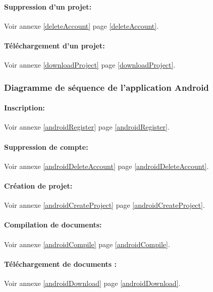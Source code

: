 \documentclass[a4paper,12pt]{article}
\begin{document}
\paragraph{Suppression d'un projet:\\}
Voir annexe \ref{deleteAccount} page \ref{deleteAccount}.

\paragraph{Téléchargement d'un projet:\\}
Voir annexe \ref{downloadProject} page \ref{downloadProject}.

\subsubsection{Diagramme de séquence de l'application Android}

\paragraph{Inscription:\\}
Voir annexe \ref{androidRegister} page \ref{androidRegister}.

\paragraph{Suppression de compte:\\}
Voir annexe \ref{androidDeleteAccount} page \ref{androidDeleteAccount}.

\paragraph{Création de projet:\\}
Voir annexe \ref{androidCreateProject} page \ref{androidCreateProject}.

\paragraph{Compilation de documents:\\}
Voir annexe \ref{androidCompile} page \ref{androidCompile}.

\paragraph{Téléchargement de documents :\\}
Voir annexe \ref{androidDownload} page \ref{androidDownload}.
\end{document}

